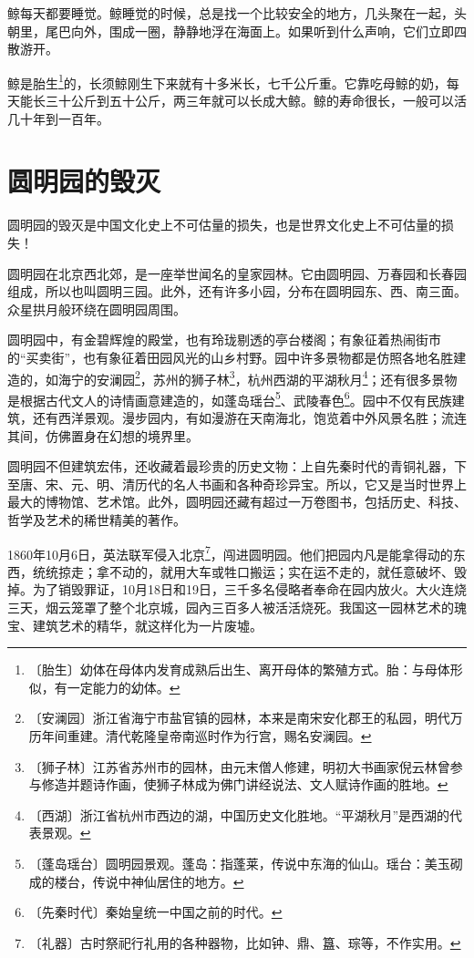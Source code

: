 \documentclass[12pt,UTF-8,openany]{ctexbook}
\begin{document}
\begin{Large}
    鲸每天都要睡觉。鲸睡觉的时候，总是找一个比较安全的地方，几头聚在一起，头朝里，尾巴向外，围成一圈，静静地浮在海面上。如果听到什么声响，它们立即四散游开。
    
    鲸是胎生\footnote{〔胎生〕幼体在母体内发育成熟后出生、离开母体的繁殖方式。胎：与母体形似，有一定能力的幼体。}的，长须鲸刚生下来就有十多米长，七千公斤重。它靠吃母鲸的奶，每天能长三十公斤到五十公斤，两三年就可以长成大鲸。鲸的寿命很长，一般可以活几十年到一百年。
    
\end{Large}

\chapter{圆明园的毁灭}

\begin{Large}
    
    圆明园的毁灭是中国文化史上不可估量的损失，也是世界文化史上不可估量的损失！
    
    圆明园在北京西北郊，是一座举世闻名的皇家园林。它由圆明园、万春园和长春园组成，所以也叫圆明三园。此外，还有许多小园，分布在圆明园东、西、南三面。众星拱月般环绕在圆明园周围。
    
    圆明园中，有金碧辉煌的殿堂，也有玲珑剔透的亭台楼阁；有象征着热闹街市的“买卖街”，也有象征着田园风光的山乡村野。园中许多景物都是仿照各地名胜建造的，如海宁的安澜园\footnote{〔安澜园〕浙江省海宁市盐官镇的园林，本来是南宋安化郡王的私园，明代万历年间重建。清代乾隆皇帝南巡时作为行宫，赐名安澜园。}，苏州的狮子林\footnote{〔狮子林〕江苏省苏州市的园林，由元末僧人修建，明初大书画家倪云林曾参与修造并题诗作画，使狮子林成为佛门讲经说法、文人赋诗作画的胜地。}，杭州西湖的平湖秋月\footnote{〔西湖〕浙江省杭州市西边的湖，中国历史文化胜地。“平湖秋月”是西湖的代表景观。}；还有很多景物是根据古代文人的诗情画意建造的，如蓬岛瑶台\footnote{〔蓬岛瑶台〕圆明园景观。蓬岛：指蓬莱，传说中东海的仙山。瑶台：美玉砌成的楼台，传说中神仙居住的地方。}、武陵春色\footnote{〔先秦时代〕秦始皇统一中国之前的时代。}。园中不仅有民族建筑，还有西洋景观。漫步园内，有如漫游在天南海北，饱览着中外风景名胜；流连其间，仿佛置身在幻想的境界里。
    
    圆明园不但建筑宏伟，还收藏着最珍贵的历史文物：上自先秦时代的青铜礼器，下至唐、宋、元、明、清历代的名人书画和各种奇珍异宝。所以，它又是当时世界上最大的博物馆、艺术馆。此外，圆明园还藏有超过一万卷图书，包括历史、科技、哲学及艺术的稀世精美的著作。
    
    1860年10月6日，英法联军侵入北京\footnote{〔礼器〕古时祭祀行礼用的各种器物，比如钟、鼎、簋、琮等，不作实用。}，闯进圆明园。他们把园内凡是能拿得动的东西，统统掠走；拿不动的，就用大车或牲口搬运；实在运不走的，就任意破坏、毁掉。为了销毁罪证，10月18日和19日，三千多名侵略者奉命在园内放火。大火连烧三天，烟云笼罩了整个北京城，园內三百多人被活活烧死。我国这一园林艺术的瑰宝、建筑艺术的精华，就这样化为一片废墟。
    
\end{Large}
\end{document}
